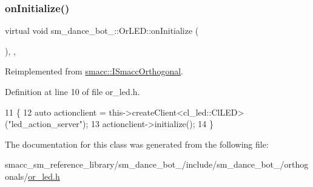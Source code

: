 \subsubsection{\texorpdfstring{on\+Initialize()}{onInitialize()}}
{\footnotesize\ttfamily virtual void sm\+\_\+dance\+\_\+bot\+\_\+::\+Or\+L\+E\+D\+::on\+Initialize (\begin{DoxyParamCaption}{ }\end{DoxyParamCaption})\hspace{0.3cm}{\ttfamily [inline]}, {\ttfamily [override]}, {\ttfamily [virtual]}}



Reimplemented from \hyperlink{classsmacc_1_1ISmaccOrthogonal_a6bb31c620cb64dd7b8417f8705c79c7a}{smacc\+::\+I\+Smacc\+Orthogonal}.



Definition at line 10 of file or\+\_\+led.\+h.


\begin{DoxyCode}
11     \{
12         \textcolor{keyword}{auto} actionclient = this->createClient<cl\_led::ClLED>(\textcolor{stringliteral}{"led\_action\_server"});
13         actionclient->initialize();
14     \}
\end{DoxyCode}


The documentation for this class was generated from the following file\+:\begin{DoxyCompactItemize}
\item 
smacc\+\_\+sm\+\_\+reference\+\_\+library/sm\+\_\+dance\+\_\+bot\+\_/include/sm\+\_\+dance\+\_\+bot\+\_/orthogonals/\hyperlink{sm__dance__bot__2_2include_2sm__dance__bot__2_2orthogonals_2or__led_8h}{or\+\_\+led.\+h}\end{DoxyCompactItemize}

